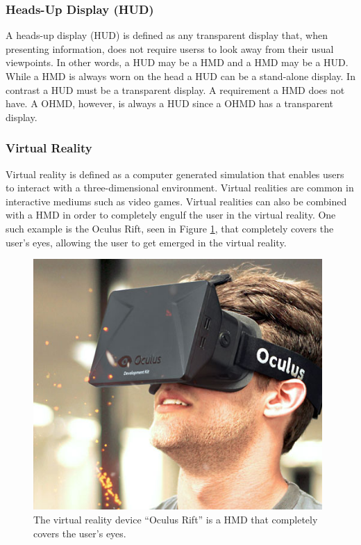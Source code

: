 \subsubsection{Heads-Up Display (HUD)}
\label{subsubsec:hud}
A heads-up display (HUD)\cite{hudWiki} is defined as any transparent display that, when presenting information, does not require userss to look away from their usual viewpoints. In other words, a HUD may be a HMD and a HMD may be a HUD. While a HMD is always worn on the head a HUD can be a stand-alone display. In contrast a HUD must be a transparent display. A requirement a HMD does not have. A OHMD, however, is always a HUD since a OHMD has a transparent display.

\subsubsection{Virtual Reality}
\label{subsubsec:vr}
Virtual reality\cite{virtualRealityDef} is defined as a computer generated simulation that enables users to interact with a three-dimensional environment. Virtual realities are common in interactive mediums such as video games. Virtual realities can also be combined with a HMD in order to completely engulf the user in the virtual reality. One such example is the Oculus Rift, seen in Figure \ref{OculusRift}, that completely covers the user's eyes, allowing the user to get emerged in the virtual reality.

	\begin{figure}[ht!]
		\centering
		\includegraphics[width=110mm]{images/OculusRift}
		\caption{The virtual reality device ``Oculus Rift'' is a HMD that completely covers the user's eyes.\cite{ImagesOculusRift}}
		\label{OculusRift}
	\end{figure}

